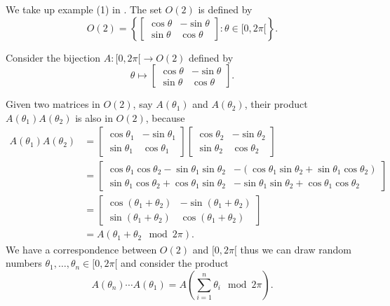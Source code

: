 \begin{example}
	We take up example (1) in \cite{bochi2016furstenberg}. The set $O(2)$ is defined by
	\[
	O(2) = \left \{ 
	\begin{bmatrix}
		\cos \theta & - \sin \theta \\
		\sin \theta & \cos \theta
	\end{bmatrix}
	: \theta \in [0, 2 \pi[
	\right \}.
	\]
	
	Consider the bijection $ A : [0, 2 \pi[ \to O(2)$ defined by 
	\[ 
	\theta \mapsto  
	\begin{bmatrix}
		\cos \theta & - \sin \theta \\
		\sin \theta & \cos \theta
	\end{bmatrix}.
	\]
	
	Given two matrices in $O(2)$, say $A(\theta_1)$ and $A(\theta_2)$, their product $A(\theta_1) A(\theta_2)$ is also in $O(2)$, because
	\begin{align*}
		A(\theta_1) A(\theta_2) & = 
		\begin{bmatrix}
			\cos \theta_1 & - \sin \theta_1 \\
			\sin \theta_1 & \cos \theta_1
		\end{bmatrix}
		\begin{bmatrix}
			\cos \theta_2 & - \sin \theta_2 \\
			\sin \theta_2 & \cos \theta_2
		\end{bmatrix} \\
		& = 
		\begin{bmatrix}
			\cos \theta_1 \cos \theta_2 - \sin \theta_1 \sin \theta_2 & - (\cos \theta_1 \sin \theta_2 + \sin \theta_1 \cos \theta_2) \\
			\sin \theta_1 \cos \theta_2 + \cos \theta_1 \sin \theta_2 & - \sin \theta_1 \sin \theta_2 + \cos \theta_1 \cos \theta_2 
		\end{bmatrix} \\
		& = 
		\begin{bmatrix}
			\cos(\theta_1 + \theta_2) & - \sin(\theta_1 + \theta_2) \\
			\sin(\theta_1 + \theta_2) & \cos(\theta_1 + \theta_2)
		\end{bmatrix} \\
		&= A(\theta_1 + \theta_2 \mod 2\pi).
	\end{align*}
We have a correspondence between $O(2)$ and $[0, 2\pi[$ thus we can draw random numbers $\theta_1, \ldots, \theta_n \in [0, 2\pi[$ and consider the product
\[
A(\theta_n) \cdots A(\theta_1) = A \left( \sum_{i=1}^{n}{\theta_i}  \mod 2 \pi \right).
\]


\end{example}
